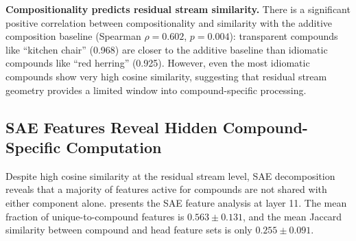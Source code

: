 {\bf Compositionality predicts residual stream similarity.}
There is a significant positive correlation between compositionality and similarity with the additive composition baseline (Spearman $\rho = 0.602$, $p = 0.004$): transparent compounds like ``kitchen chair'' (0.968) are closer to the additive baseline than idiomatic compounds like ``red herring'' (0.925).
However, even the most idiomatic compounds show very high cosine similarity, suggesting that residual stream geometry provides a limited window into compound-specific processing.

\subsection{SAE Features Reveal Hidden Compound-Specific Computation}
\label{sec:results_exp2}

Despite high cosine similarity at the residual stream level, SAE decomposition reveals that a majority of features active for compounds are not shared with either component alone.
 presents the SAE feature analysis at layer 11.
The mean fraction of unique-to-compound features is $0.563 \pm 0.131$, and the mean Jaccard similarity between compound and head feature sets is only $0.255 \pm 0.091$.


